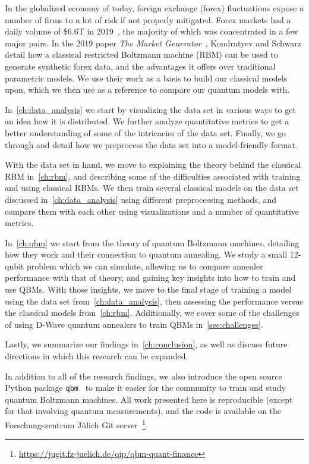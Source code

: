 In the globalized economy of today, foreign exchange (forex) fluctuations expose a number of firms to a lot of risk if not properly mitigated.
Forex markets had a daily volume of \$6.6T in 2019~\cite{bis_2019}, the majority of which was concentrated in a few major pairs.
In the 2019 paper \textit{The Market Generator}~\cite{kondratyev_2019}, Kondratyev and Schwarz detail how a classical restricted Boltzmann machine (RBM) can be used to generate synthetic forex data, and the advantages it offers over traditional parametric models.
We use their work as a basis to build our classical models upon, which we then use as a reference to compare our quantum models with.

In~\cref{ch:data_analysis} we start by visualizing the data set in various ways to get an idea how it is distributed.
We further analyze quantitative metrics to get a better understanding of some of the intricacies of the data set.
Finally, we go through and detail how we preprocess the data set into a model-friendly format.

With the data set in hand, we move to explaining the theory behind the classical RBM in~\cref{ch:rbm}, and describing some of the difficulties associated with training and using classical RBMs.
We then train several classical models on the data set discussed in~\cref{ch:data_analysis} using different preprocessing methods, and compare them with each other using visualizations and a number of quantitative metrics.

In~\cref{ch:qbm} we start from the theory of quantum Boltzmann machines, detailing how they work and their connection to quantum annealing.
We study a small 12-qubit problem which we can simulate, allowing us to compare annealer performance with that of theory, and gaining key insights into how to train and use QBMs.
With those insights, we move to the final stage of training a model using the data set from~\cref{ch:data_analysis}, then assessing the performance versus the classical models from~\cref{ch:rbm}.
Additionally, we cover some of the challenges of using D-Wave quantum annealers to train QBMs in~\cref{sec:challenges}.

Lastly, we summarize our findings in~\cref{ch:conclusion}, as well as discuss future directions in which this research can be expanded.

In addition to all of the research findings, we also introduce the open source Python package \texttt{qbm}~\cite{qbm} to make it easier for the community to train and study quantum Boltzmann machines.
All work presented here is reproducible (except for that involving quantum measurements), and the code is available on the Forschungszentrum J\"ulich Git server~\footnote{\url{https://jugit.fz-juelich.de/qip/qbm-quant-finance}}.
